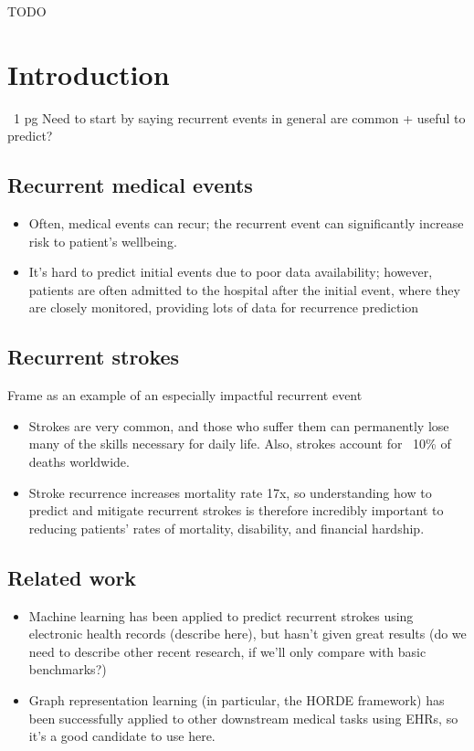 \documentclass[conference]{IEEEtran}
\begin{document}
\begin{IEEEkeywords}
TODO
\end{IEEEkeywords}

\section{Introduction}
~1 pg
{\color{red}Need to start by saying recurrent events in general are common + useful to predict?}

\subsection{Recurrent medical events}
\begin{itemize}
    \item Often, medical events can recur; the recurrent event can significantly increase risk to patient's wellbeing.
    \item It's hard to predict initial events due to poor data availability; however, patients are often admitted to the hospital after the initial event, where they are closely monitored, providing lots of data for recurrence prediction
\end{itemize}

\subsection{Recurrent strokes}
{\color{red}Frame as an example of an especially impactful recurrent event}

\begin{itemize}
    \item Strokes are very common, and those who suffer them can permanently lose many of the skills necessary for daily life. Also, strokes account for ~10\% of deaths worldwide.
    \item Stroke recurrence increases mortality rate 17x, so understanding how to predict and mitigate recurrent strokes is therefore incredibly important to reducing patients' rates of mortality, disability, and financial hardship.
\end{itemize}

\subsection{Related work}
\begin{itemize}
    \item Machine learning has been applied to predict recurrent strokes using electronic health records (describe here), but hasn't given great results {\color{red}(do we need to describe other recent research, if we'll only compare with basic benchmarks?})
    \item Graph representation learning (in particular, the HORDE framework) has been successfully applied to other downstream medical tasks using EHRs, so it's a good candidate to use here.
\end{itemize}
\end{document}
